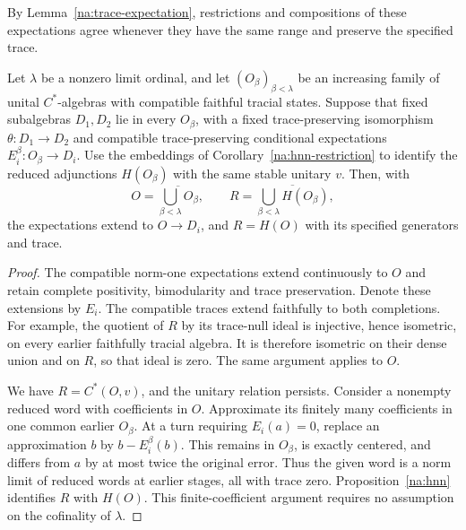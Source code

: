 By Lemma~\ref{na:trace-expectation}, restrictions and compositions of
these expectations agree whenever they have the same range and
preserve the specified trace.

\begin{lemma}\label{na:hnn-limit}
Let $\lambda$ be a nonzero limit ordinal, and let
$(O_\beta)_{\beta<\lambda}$ be an increasing family of unital
$C^*$-algebras with compatible faithful tracial states.  Suppose that
fixed subalgebras $D_1,D_2$ lie in every $O_\beta$, with a fixed
trace-preserving isomorphism $\theta:D_1\to D_2$ and compatible
trace-preserving conditional expectations $E_i^\beta:O_\beta\to D_i$.
Use the embeddings of Corollary~\ref{na:hnn-restriction} to identify
the reduced adjunctions $H(O_\beta)$ with the same stable unitary $v$.
Then, with
\[
 O=\overline{\bigcup_{\beta<\lambda}O_\beta},\qquad
 R=\overline{\bigcup_{\beta<\lambda}H(O_\beta)},
\]
the expectations extend to $O\to D_i$, and $R=H(O)$ with its
specified generators and trace.
\end{lemma}

\begin{proof}
The compatible norm-one expectations extend continuously to $O$ and
retain complete positivity, bimodularity and trace preservation.
Denote these extensions by $E_i$.
The compatible traces extend faithfully to both completions.  For
example, the quotient of $R$ by its trace-null ideal is injective,
hence isometric, on every earlier faithfully tracial algebra.  It is
therefore isometric on their dense union and on $R$, so that ideal
is zero.  The same argument applies to $O$.

We have $R=C^*(O,v)$, and the unitary relation persists.  Consider a
nonempty reduced word with coefficients in $O$.  Approximate its
finitely many coefficients in one common earlier $O_\beta$.  At a
turn requiring $E_i(a)=0$, replace an approximation $b$ by
$b-E_i^\beta(b)$.  This remains in $O_\beta$, is exactly centered,
and differs from $a$ by at most twice the original error.  Thus the
given word is a norm limit of reduced words at earlier stages, all
with trace zero.  Proposition~\ref{na:hnn} identifies $R$ with $H(O)$.
This finite-coefficient argument requires no assumption on the
cofinality of $\lambda$.
\end{proof}
